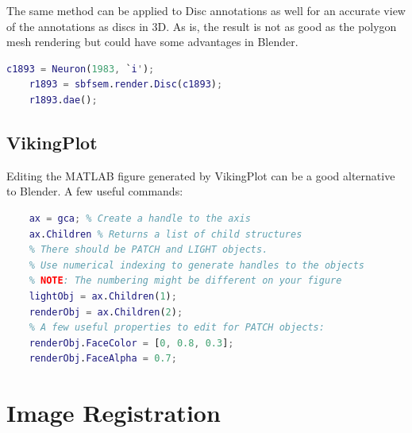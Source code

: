\documentclass[12pt]{exam}
\begin{document}
	The same method can be applied to Disc annotations as well for an accurate view of the annotations as discs in 3D. As is, the result is not as good as the polygon mesh rendering but could have some advantages in Blender.
	\begin{lstlisting}[language=matlab]
	c1893 = Neuron(1983, `i');
	r1893 = sbfsem.render.Disc(c1893);
	r1893.dae();\end{lstlisting}
	\subsection{VikingPlot}
	Editing the MATLAB figure generated by VikingPlot can be a good alternative to Blender. A few useful commands:
	\begin{lstlisting}[language=matlab]
	% Make sure the figure is the active window.
	ax = gca; % Create a handle to the axis
	ax.Children % Returns a list of child structures
	% There should be PATCH and LIGHT objects.
	% Use numerical indexing to generate handles to the objects
	% NOTE: The numbering might be different on your figure
	lightObj = ax.Children(1);
	renderObj = ax.Children(2);
	% A few useful properties to edit for PATCH objects:
	renderObj.FaceColor = [0, 0.8, 0.3];
	renderObj.FaceAlpha = 0.7;\end{lstlisting}
	\section{Image Registration}
\end{document}
